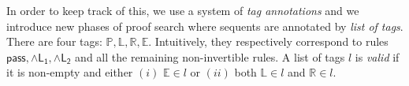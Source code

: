\documentclass[submission,copyright,creativecommons]{eptcs}
\theoremstyle{definition}
\newtheorem{defn}{Definition}[section]
\newcommand{\tr}{\otimes \mathsf{R}}
\newcommand{\pass}{\mathsf{pass}}
\newcommand{\unitr}{\mathsf{IR}}
\newcommand{\andlone}{\land \mathsf{L_{1}}}
\newcommand{\andltwo}{\land \mathsf{L_{2}}}
\newcommand{\andli}{\land \mathsf{L}_{i}}
\newcommand{\ax}{\mathsf{ax}}
\newcommand{\tP}{\mathbb{P}}
\newcommand{\tL}{\mathbb{L}}
\newcommand{\tR}{\mathbb{R}}
\newcommand{\tE}{\mathbb{E}}
\begin{document}
In order to keep track of this,
we use a system of \emph{tag annotations} and we introduce new phases of proof search where sequents are annotated by \emph{list of tags}. 
There are four tags: $\tP , \tL , \tR , \tE$. Intuitively, they respectively correspond to rules $\pass , \andlone , \andltwo$ and all the remaining non-invertible rules.
A list of tags $l$ is \emph{valid} if it is non-empty and either $(i)$ $\tE \in l$ or $(ii)$ both $\tL \in l$ and $\tR \in l$.
\end{document}
